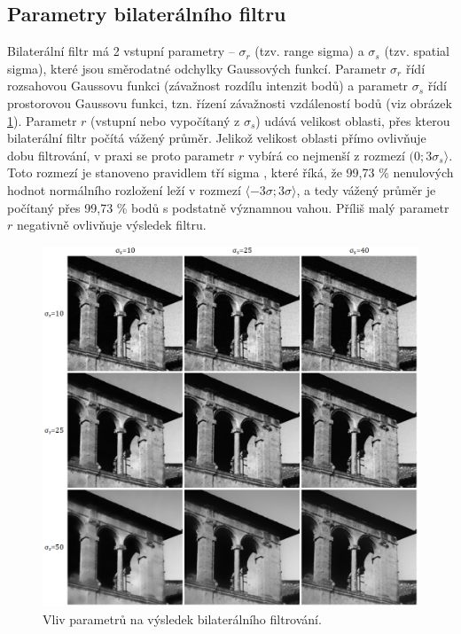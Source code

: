 \subsection*{Parametry bilaterálního filtru}
Bilaterální filtr má 2 vstupní parametry -- $\sigma_r$ (tzv. range sigma) a $\sigma_s$ (tzv. spatial sigma), které jsou směrodatné odchylky Gaussových funkcí. Parametr $\sigma_r$ řídí rozsahovou Gaussovu funkci (závažnost rozdílu intenzit bodů) a parametr $\sigma_s$ řídí prostorovou Gaussovu funkci, tzn. řízení závažnosti vzdáleností bodů (viz obrázek \ref{fig:bf:grid}). Parametr $r$ (vstupní nebo vypočítaný z $\sigma_s$) udává velikost oblasti, přes kterou bilaterální filtr počítá vážený průměr. Jelikož velikost oblasti přímo ovlivňuje dobu filtrování, v praxi se proto parametr $r$ vybírá co nejmenší z rozmezí $(0;3\sigma_s\rangle$. Toto rozmezí je stanoveno pravidlem tří sigma \cite{wiki:3sigma}, které říká, že 99,73 \% nenulových hodnot normálního rozložení leží v rozmezí $\langle-3\sigma;3\sigma\rangle$, a tedy vážený průměr je počítaný přes 99,73 \% bodů s podstatně významnou vahou. Příliš malý parametr $r$ negativně ovlivňuje výsledek filtru.

\begin{figure} [H]
    \centering
    \label{fig:bf:grid}
    \includegraphics[width=1\textwidth]{figures/bf-grid.png}
    \caption{Vliv parametrů na výsledek bilaterálního filtrování.}
\end{figure}

